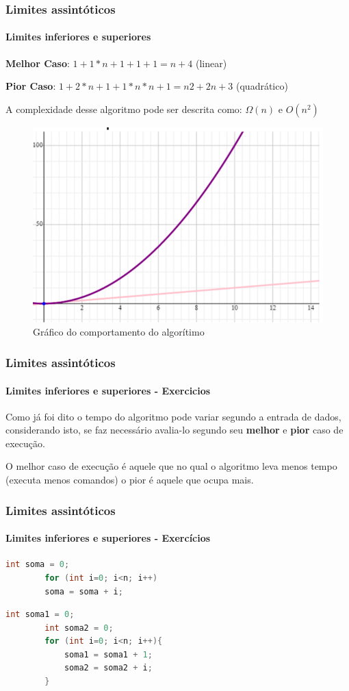 \begin{frame}
	\frametitle{Limites assintóticos}
	\framesubtitle{Limites inferiores e superiores}
	\par \textbf{Melhor Caso}: $1 + 1*n + 1 + 1 + 1 = n + 4$ (linear)
	\par \textbf{Pior Caso}: $1 + 2*n + 1 + 1*n*n + 1 = n2 + 2n + 3$ (quadrático)\newline
	\par A complexidade desse algoritmo pode ser descrita como: $\Omega(n)$ e $O(n^2)$
	\begin{figure}
		\centering
		\includegraphics[width=0.4\linewidth]{images/primeiroOmegaOzao}
		\caption{Gráfico do comportamento do algorítimo}
		\label{fig:primeiroomegaozao}
	\end{figure}
	
\end{frame}

\begin{frame}
	\frametitle{Limites assintóticos}
	\framesubtitle{Limites inferiores e superiores - Exercicios}
	\par Como já foi dito o tempo do algoritmo pode variar segundo a entrada de dados, considerando isto, se faz necessário avalia-lo segundo seu \textbf{melhor} e \textbf{pior} caso de execução.
	
	O melhor caso de execução é aquele que no qual o algoritmo leva menos tempo (executa menos comandos) o pior é aquele que ocupa mais.
\end{frame}

\begin{frame}[fragile]
	\frametitle{Limites assintóticos}
	\framesubtitle{Limites inferiores e superiores - Exercícios}
	\begin{lstlisting}[language=C++,caption={Algoritmo 1}]
		int soma = 0;
		for (int i=0; i<n; i++)
		soma = soma + i;
	\end{lstlisting}
	
	\begin{lstlisting}[language=C++,caption={Algoritmo 2}]
		int soma1 = 0;
		int soma2 = 0;
		for (int i=0; i<n; i++){
			soma1 = soma1 + 1;
			soma2 = soma2 + i;
		}
	\end{lstlisting}
	
\end{frame}


